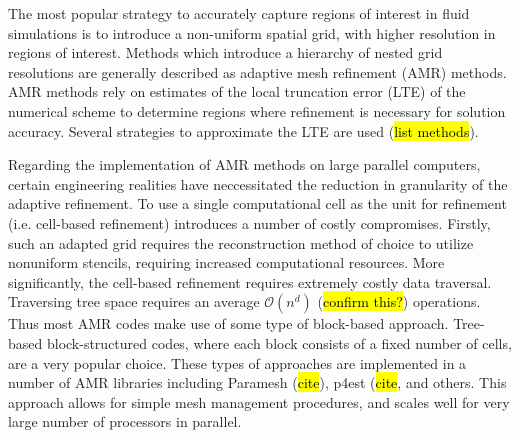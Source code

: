 \documentclass[12pt,letterpaper]{article}
\begin{document}
    The most popular strategy to accurately capture regions of interest in fluid
    simulations is to introduce a non-uniform spatial grid, with higher
    resolution in regions of interest.  Methods which introduce a hierarchy of
    nested grid resolutions are generally described as adaptive mesh refinement
    (AMR) methods. AMR methods rely on estimates of the local truncation error (LTE)
    of the numerical scheme to determine regions where refinement is necessary for solution
    accuracy. Several strategies to approximate the LTE are used (\hl{list
    methods}).

    Regarding the implementation of AMR methods on large parallel computers,
    certain engineering realities have neccessitated the reduction in
    granularity of the adaptive refinement. To use a single computational cell
    as the unit for refinement (i.e. cell-based refinement) introduces a number
    of costly compromises. Firstly, such an adapted grid requires the
    reconstruction method of choice to utilize nonuniform stencils, requiring
    increased computational resources. More significantly, the cell-based
    refinement requires extremely costly data traversal. Traversing tree space
    requires an average $\mathcal{O}(n^d)$ (\hl{confirm this?}) operations. Thus
    most AMR codes make use of some type of block-based approach. Tree-based
    block-structured codes, where each block consists of a fixed number of
    cells, are a very popular choice. These types of approaches are implemented
    in a number of AMR libraries including Paramesh (\hl{cite}), p4est
    (\hl{cite}, and others. This approach allows for simple mesh management
    procedures, and scales well for very large number of processors in parallel.
\end{document}
